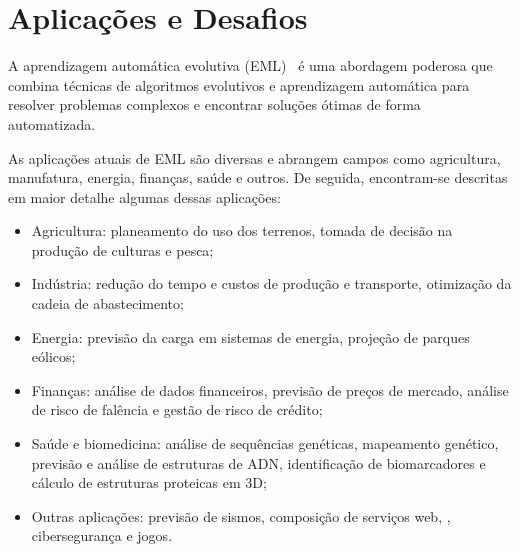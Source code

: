 \documentclass[conference]{IEEEtran}
\begin{document}
\section{Aplicações e Desafios}

A aprendizagem automática evolutiva (EML)~\cite{Al-Sahaf2019ALearning} é uma abordagem poderosa que combina técnicas de algoritmos evolutivos e aprendizagem automática para resolver problemas complexos e encontrar soluções ótimas de forma automatizada. 

As aplicações atuais de EML são diversas e abrangem campos como agricultura, manufatura, energia, finanças, saúde e outros. De seguida, encontram-se  descritas em maior detalhe algumas dessas aplicações:
\begin{itemize}
    \item Agricultura: planeamento do uso dos terrenos, tomada de decisão na produção de culturas e pesca;
    \item Indústria: redução do tempo e custos de produção e transporte, otimização da cadeia de abastecimento;
    \item Energia: previsão da carga em sistemas de energia, projeção de parques eólicos;
    \item Finanças: análise de dados financeiros, previsão de preços de mercado, análise de risco de falência e gestão de risco de crédito;
    \item Saúde e biomedicina: análise de sequências genéticas, mapeamento genético, previsão e análise de estruturas de ADN, identificação de biomarcadores e cálculo de estruturas proteicas em 3D;
    \item Outras aplicações: previsão de sismos, composição de serviços web, , cibersegurança e jogos.
\end{itemize}
\end{document}
